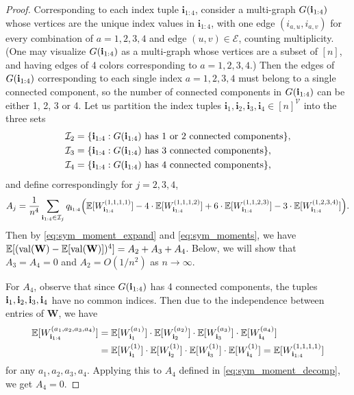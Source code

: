 \documentclass[10pt,reqno]{amsart}
\def\cV{\mathcal{V}}
\def\cE{\mathcal{E}}
\def\val{\operatorname{val}}
\def\bW{{\mathbf{W}}}
\def\bi{\mathbf{i}}
\begin{document}
\begin{proof}
Corresponding to each index tuple $\bi_{1:4}$, consider a multi-graph
$G(\mathbf{i}_{1:4})$ whose vertices are the unique index values in $\bi_{1:4}$,
with one edge $(i_{a,u},i_{a,v})$ for every combination of
$a=1,2,3,4$ and edge $(u,v) \in \cE$, counting multiplicity.
(One may visualize $G(\mathbf{i}_{1:4})$ as a
multi-graph whose vertices are a subset of $[n]$, and having edges of 4 colors
corresponding to $a=1,2,3,4$.) Then the edges of $G(\mathbf{i}_{1:4})$
corresponding to each single index $a=1,2,3,4$ must belong to a single connected
component, so the number of connected 
components in $G(\mathbf{i}_{1:4})$ can be either 1, 2, 3 or 4.
Let us partition the index tuples $\bi_1,\bi_2,\bi_3,\bi_4 \in [n]^\cV$
into the three sets
\begin{align*}
    \mathcal{I}_2 &= \{\mathbf{i}_{1:4}: G(\mathbf{i}_{1:4}) \text{ has 1 or 2 connected components}\},\\
    \mathcal{I}_3 &= \{\mathbf{i}_{1:4}: G(\mathbf{i}_{1:4}) \text{ has 3 connected components}\},\\
    \mathcal{I}_4 &= \{\mathbf{i}_{1:4}: G(\mathbf{i}_{1:4}) \text{ has 4 connected components}\},
\end{align*}
and define correspondingly for $j = 2, 3, 4$,
\begin{align}\label{eq:sym_moment_decomp}
    A_j = \frac{1}{n^4} \sum_{\mathbf{i}_{1:4} \in \mathcal{I}_j} q_{\mathbf{i}_{1:4}} 
    \Big(\mathbb{E}[W_{\mathbf{i}_{1:4}}^{(1, 1, 1, 1)}] 
    - 4 \cdot \mathbb{E}[W_{\mathbf{i}_{1:4}}^{(1, 1, 1, 2)}]
    + 6 \cdot \mathbb{E}[W_{\mathbf{i}_{1:4}}^{(1, 1, 2, 3)}] 
    - 3 \cdot \mathbb{E}[W_{\mathbf{i}_{1:4}}^{(1, 2, 3, 4)}]\Big).
\end{align}
Then by \eqref{eq:sym_moment_expand} and \eqref{eq:sym_moments}, we have 
$\EE[(\val(\bW) - \EE[\val(\bW)])^4] = A_2 + A_3 + A_4$.
Below, we will show that $A_3 = A_4 = 0$ and $A_2=O(1/n^2)$ as $n \to \infty$.

For $A_4$, observe that
since $G(\mathbf{i}_{1:4})$ has 4 connected components, the tuples
$\mathbf{i}_1, \mathbf{i}_2, \mathbf{i}_3, \mathbf{i}_4$ have no common indices.
Then due to the independence between entries of $\bW$, we have 
\begin{align*}
    \mathbb{E}[W^{(a_1, a_2, a_3, a_4)}_{\mathbf{i}_{1:4}}] &= \mathbb{E}[W^{(a_1)}_{\mathbf{i}_1}] \cdot 
    \mathbb{E}[W^{(a_2)}_{\mathbf{i}_2}] \cdot \mathbb{E}[W^{(a_3)}_{\mathbf{i}_3}] \cdot
\mathbb{E}[W^{(a_4)}_{\mathbf{i}_4}]\\
    &= \mathbb{E}[W^{(1)}_{\mathbf{i}_1}] \cdot \mathbb{E}[W^{(1)}_{\mathbf{i}_2}] \cdot \mathbb{E}[W^{(1)}_{\mathbf{i}_3}] 
    \cdot \mathbb{E}[W^{(1)}_{\mathbf{i}_4}]
    = \mathbb{E}[W_{\mathbf{i}_{1:4}}^{(1, 1, 1, 1)}]
\end{align*}
for any $a_1, a_2, a_3, a_4$.
Applying this to $A_4$ defined in \eqref{eq:sym_moment_decomp}, we get $A_4=0$.


\end{proof}
\end{document}
